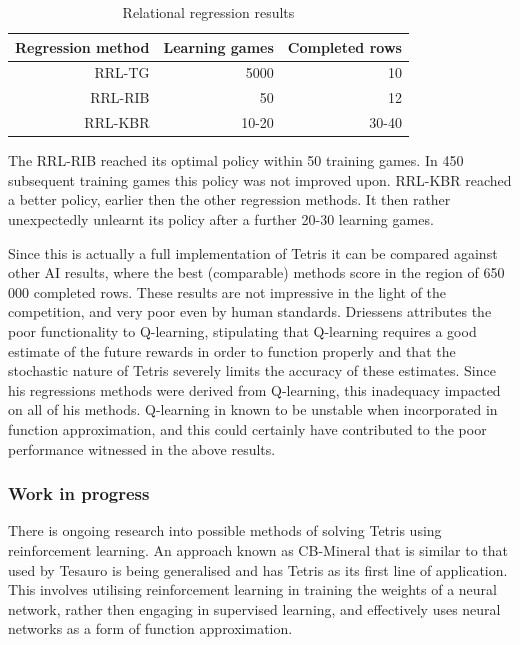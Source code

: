 \documentclass[a4paper]{article}%
\begin{document}
\begin{table}[h]
\centering
\begin{tabular}{|r|r|r|}
\hline
Regression method & Learning games & Completed rows  \\
\hline
RRL-TG	&	5000	& 	10   \\
\hline
RRL-RIB  &  50  & 12  \\
\hline
RRL-KBR  &  10-20  & 30-40  \\
\hline
\end{tabular}
\caption{Relational regression results \citep{kurt}}
\label{abc}
\end{table}

The RRL-RIB reached its optimal policy within 50 training games. In 450 subsequent training games this policy was not improved upon. RRL-KBR reached a better policy, earlier then the other regression methods. It then rather unexpectedly unlearnt its policy after a further 20-30 learning games.

Since this is actually a full implementation of Tetris it can be compared against other AI results, where the best (comparable) methods score in the region of 650 000 completed rows\citep{tetstand}. These results are not impressive in the light of the competition, and very poor even by human standards. Driessens attributes the poor functionality to Q-learning, stipulating that Q-learning requires a good estimate of the future rewards in order to function properly and that the stochastic nature of Tetris severely limits the accuracy of these estimates. Since his regressions methods were derived from Q-learning, this inadequacy impacted on all of his methods. Q-learning in known to be unstable\citep[pg. 4]{keepaway,thrun93issues} when incorporated in function approximation, and this could certainly have contributed to the poor performance witnessed in the above results.

\subsubsection{Work in progress}

There is ongoing research into possible methods of solving Tetris using reinforcement learning. An approach known as CB-Mineral that is similar to that used by Tesauro \citep{tdgammon} is being generalised and has Tetris as its first line of application\citep{cuttingtet}. This involves utilising reinforcement learning in training the weights of a neural network, rather then engaging in supervised learning, and effectively uses neural networks as a form of function approximation.
\end{document}
